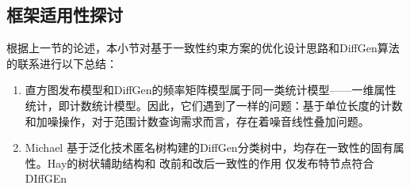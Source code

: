 \subsection{框架适用性探讨}

根据上一节的论述，本小节对基于一致性约束方案的优化设计思路和DiffGen算法的联系进行以下总结：
\begin{enumerate}
	\item 直方图发布模型和DiffGen的频率矩阵模型属于同一类统计模型——一维属性统计，即计数统计模型。因此，它们遇到了一样的问题：基于单位长度的计数和加噪操作，对于范围计数查询需求而言，存在着噪音线性叠加问题。
	\item Michael 基于泛化技术匿名树构建的DiffGen分类树中，均存在一致性的固有属性。Hay的树状辅助结构和
	改前和改后一致性的作用
	仅发布特节点符合DIffGEn
	
\end{enumerate}
